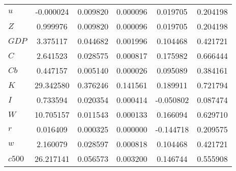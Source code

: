 \begin{center}
\begin{longtable}{lccccc}
$u         $	 & 	       -0.000024	 & 	        0.009820	 & 	        0.000096	 & 	        0.019705	 & 	        0.204198 \\ 
$Z         $	 & 	        0.999976	 & 	        0.009820	 & 	        0.000096	 & 	        0.019705	 & 	        0.204198 \\ 
$GDP       $	 & 	        3.375117	 & 	        0.044682	 & 	        0.001996	 & 	        0.104468	 & 	        0.421721 \\ 
$C         $	 & 	        2.641523	 & 	        0.028575	 & 	        0.000817	 & 	        0.175982	 & 	        0.666444 \\ 
$Cb        $	 & 	        0.447157	 & 	        0.005140	 & 	        0.000026	 & 	        0.095089	 & 	        0.384161 \\ 
$K         $	 & 	       29.342580	 & 	        0.376246	 & 	        0.141561	 & 	        0.189911	 & 	        0.721794 \\ 
$I         $	 & 	        0.733594	 & 	        0.020354	 & 	        0.000414	 & 	       -0.050802	 & 	        0.087474 \\ 
$W         $	 & 	       10.705157	 & 	        0.011543	 & 	        0.000133	 & 	        0.166094	 & 	        0.629710 \\ 
$r         $	 & 	        0.016409	 & 	        0.000325	 & 	        0.000000	 & 	       -0.144718	 & 	        0.209575 \\ 
$w         $	 & 	        2.160079	 & 	        0.028597	 & 	        0.000818	 & 	        0.104468	 & 	        0.421721 \\ 
$c500      $	 & 	       26.217141	 & 	        0.056573	 & 	        0.003200	 & 	        0.146744	 & 	        0.555908 \\ 
\end{longtable}
 \end{center}
